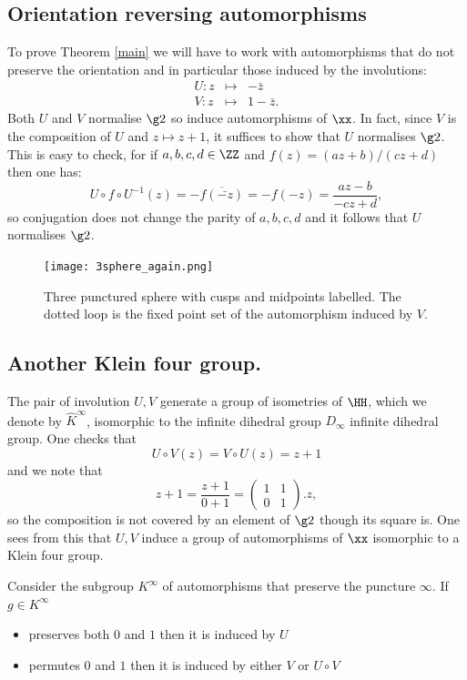 \subsection{Orientation reversing automorphisms}
To prove Theorem \ref{main} we will have to work with automorphisms
that do not preserve the orientation and in particular 
those induced by the involutions:
\begin{eqnarray*}
U: z &\mapsto& -\bar{z} \\
V: z &\mapsto& 1 -\bar{z}.
\end{eqnarray*}
Both $U$ and $V$ normalise $\g2$ so induce automorphisms of $\xx$.
In fact, since $V$ is the composition of $U$ and $z \mapsto z + 1$,
it suffices to show that $U$ normalises $\g2$.
This is easy to check, for if  $a,b,c,d \in \ZZ$ 
and  $f(z) = (az + b)/ (cz +d )$  then one has:
$$ U\circ f \circ U^{-1} (z) =  -\overline{f(\bar{-z})} = -f(-z) =   \frac{az - b}{-cz +d }, $$
  so conjugation does not change the parity of $a,b,c,d$ 
  and it follows that  $U$ normalises $\g2$.


 \begin{figure}[hb]
\begin{center}
\texttt{[image: 3sphere\_again.png]} 
\end{center}
\caption{Three punctured sphere with cusps and midpoints labelled.
The dotted loop is the fixed point set of the automorphism induced by $V$.}
 \label{3punctured}
\end{figure}



\subsection{Another Klein four group.}

The pair of involution $U,V$ generate a group 
of isometries of $\HH$,  which we denote by $\hat{K}^\infty$, 
 isomorphic to the infinite dihedral group $D_\infty$
infinite dihedral group. One checks that 
$$U\circ V (z) = V \circ U (z) = z + 1$$
and we note that 
$$  z + 1 = \frac{z+ 1}{ 0 + 1} = \begin{pmatrix}
1 & 1 \\ 0 & 1
\end{pmatrix}. z,$$
so the composition is not covered  by an element of $\g2$ though its square is.
One sees  from this that 
$U,V$ induce a  group of automorphisms of $\xx$ isomorphic to  a Klein four group.

Consider the subgroup $K^\infty$ of automorphisms that 
preserve the puncture $\infty$.
 If $g\in K^\infty$
\begin{itemize}
\item  preserves both  $0$ and $ 1$ then it is induced by $U$
\item  permutes  $0$ and $ 1$ then it is induced by either  $V$  or $U\circ V$
\end{itemize}

